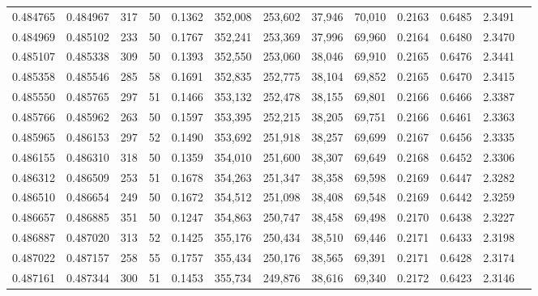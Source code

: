 \begin{tabular}{rrrrrrrrrrrrr}
0.484765 & 0.484967 &   317 &  50 &                                     0.1362 & 352,008 & 253,602 &  37,946 &  70,010 & 0.2163 & 0.6485 & 2.3491 \\
0.484969 & 0.485102 &   233 &  50 &                                     0.1767 & 352,241 & 253,369 &  37,996 &  69,960 & 0.2164 & 0.6480 & 2.3470 \\
0.485107 & 0.485338 &   309 &  50 &                                     0.1393 & 352,550 & 253,060 &  38,046 &  69,910 & 0.2165 & 0.6476 & 2.3441 \\
0.485358 & 0.485546 &   285 &  58 &                                     0.1691 & 352,835 & 252,775 &  38,104 &  69,852 & 0.2165 & 0.6470 & 2.3415 \\
0.485550 & 0.485765 &   297 &  51 &                                     0.1466 & 353,132 & 252,478 &  38,155 &  69,801 & 0.2166 & 0.6466 & 2.3387 \\
0.485766 & 0.485962 &   263 &  50 &                                     0.1597 & 353,395 & 252,215 &  38,205 &  69,751 & 0.2166 & 0.6461 & 2.3363 \\
0.485965 & 0.486153 &   297 &  52 &                                     0.1490 & 353,692 & 251,918 &  38,257 &  69,699 & 0.2167 & 0.6456 & 2.3335 \\
0.486155 & 0.486310 &   318 &  50 &                                     0.1359 & 354,010 & 251,600 &  38,307 &  69,649 & 0.2168 & 0.6452 & 2.3306 \\
0.486312 & 0.486509 &   253 &  51 &                                     0.1678 & 354,263 & 251,347 &  38,358 &  69,598 & 0.2169 & 0.6447 & 2.3282 \\
0.486510 & 0.486654 &   249 &  50 &                                     0.1672 & 354,512 & 251,098 &  38,408 &  69,548 & 0.2169 & 0.6442 & 2.3259 \\
0.486657 & 0.486885 &   351 &  50 &                                     0.1247 & 354,863 & 250,747 &  38,458 &  69,498 & 0.2170 & 0.6438 & 2.3227 \\
0.486887 & 0.487020 &   313 &  52 &                                     0.1425 & 355,176 & 250,434 &  38,510 &  69,446 & 0.2171 & 0.6433 & 2.3198 \\
0.487022 & 0.487157 &   258 &  55 &                                     0.1757 & 355,434 & 250,176 &  38,565 &  69,391 & 0.2171 & 0.6428 & 2.3174 \\
0.487161 & 0.487344 &   300 &  51 &                                     0.1453 & 355,734 & 249,876 &  38,616 &  69,340 & 0.2172 & 0.6423 & 2.3146 \\

\end{tabular}

